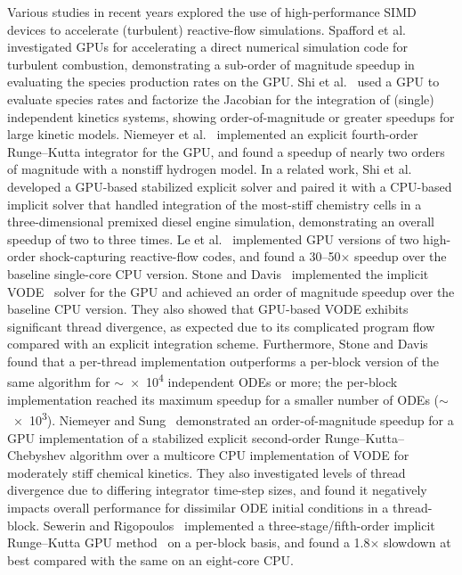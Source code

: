 \documentclass[preprint,review,11pt]{elsarticle}
\begin{document}
Various studies in recent years explored the use of high-performance SIMD devices to accelerate (turbulent) reactive-flow simulations.
Spafford et al.~\cite{Spafford:2010aa} investigated GPUs for accelerating a direct numerical simulation code for turbulent combustion, demonstrating a sub-order of magnitude speedup in evaluating the species production rates on the GPU.
Shi et al.~\cite{Shi:2011aa} used a GPU to evaluate species rates and factorize the Jacobian for the integration of (single) independent kinetics systems, showing order-of-magnitude or greater speedups for large kinetic models.
Niemeyer et al.~\cite{Niemeyer:2011aa} implemented an explicit fourth-order Runge--Kutta integrator for the GPU, and found a speedup of nearly two orders of magnitude with a nonstiff hydrogen model.
In a related work, Shi et al.~\cite{Shi:2012aa} developed a GPU-based stabilized explicit solver and paired it with a CPU-based implicit solver that handled integration of the most-stiff chemistry cells in a three-dimensional premixed diesel engine simulation, demonstrating an overall speedup of two to three times.
Le et al.~\cite{Le2013596} implemented GPU versions of two high-order shock-capturing reactive-flow codes, and found a \numrange{30}{50}$\times$ speedup over the baseline single-core CPU version.
Stone and Davis~\cite{Stone:2013aa} implemented the implicit VODE~\cite{Brown:1989vl} solver for the GPU and achieved an order of magnitude speedup over the baseline CPU version.
They also showed that GPU-based VODE exhibits significant thread divergence, as expected due to its complicated program flow compared with an explicit integration scheme.
Furthermore, Stone and Davis~\cite{Stone:2013aa} found that a per-thread implementation outperforms a per-block version of the same algorithm for $\sim$\num{e4} independent ODEs or more; the per-block implementation reached its maximum speedup for a smaller number of ODEs ($\sim$\num{e3}).
Niemeyer and Sung~\cite{Niemeyer:2014aa} demonstrated an order-of-magnitude speedup for a GPU implementation of a stabilized explicit second-order Runge--Kutta--Chebyshev algorithm over a multicore CPU implementation of VODE for moderately stiff chemical kinetics.
They also investigated levels of thread divergence due to differing integrator time-step sizes, and found it negatively impacts overall performance for dissimilar ODE initial conditions in a thread-block.
Sewerin and Rigopoulos~\cite{Sewerin20151375} implemented a three-stage\slash fifth-order implicit Runge--Kutta GPU method~\cite{wanner1991solving} on a per-block basis, and found a \num{1.8}$\times$ slowdown at best compared with the same on an eight-core CPU.
\end{document}
